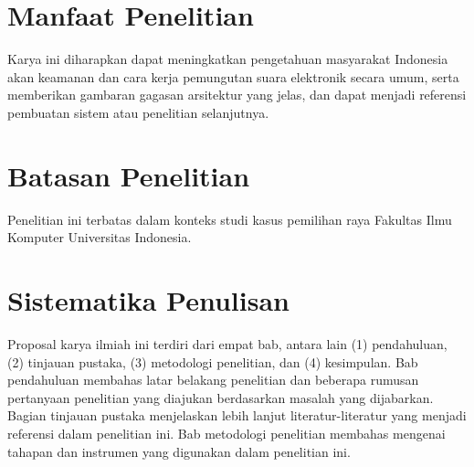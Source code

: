 \section{Manfaat Penelitian}
Karya ini diharapkan dapat meningkatkan pengetahuan masyarakat Indonesia akan keamanan dan cara kerja pemungutan suara elektronik secara umum, serta memberikan gambaran gagasan arsitektur yang jelas, dan dapat menjadi referensi pembuatan sistem atau penelitian selanjutnya.

\section{Batasan Penelitian}
Penelitian ini terbatas dalam konteks studi kasus pemilihan raya Fakultas Ilmu Komputer Universitas Indonesia.

\section{Sistematika Penulisan}
Proposal karya ilmiah ini terdiri dari empat bab, antara lain (1) pendahuluan, (2) tinjauan pustaka, (3) metodologi penelitian, dan (4) kesimpulan. Bab pendahuluan membahas latar belakang penelitian dan beberapa rumusan pertanyaan penelitian yang diajukan berdasarkan masalah yang dijabarkan. Bagian tinjauan pustaka menjelaskan lebih lanjut literatur-literatur yang menjadi referensi dalam penelitian ini. Bab metodologi penelitian membahas mengenai tahapan dan instrumen yang digunakan dalam penelitian ini.